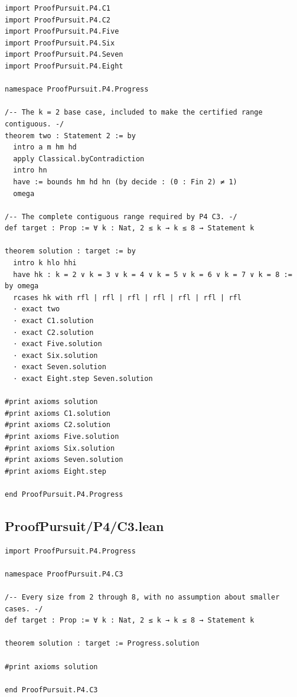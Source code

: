\documentclass[11pt,a4paper]{article}
\begin{document}
\begin{Verbatim}[breaklines,breakanywhere,fontsize=\footnotesize]
import ProofPursuit.P4.C1
import ProofPursuit.P4.C2
import ProofPursuit.P4.Five
import ProofPursuit.P4.Six
import ProofPursuit.P4.Seven
import ProofPursuit.P4.Eight

namespace ProofPursuit.P4.Progress

/-- The k = 2 base case, included to make the certified range contiguous. -/
theorem two : Statement 2 := by
  intro a m hm hd
  apply Classical.byContradiction
  intro hn
  have := bounds hm hd hn (by decide : (0 : Fin 2) ≠ 1)
  omega

/-- The complete contiguous range required by P4 C3. -/
def target : Prop := ∀ k : Nat, 2 ≤ k → k ≤ 8 → Statement k

theorem solution : target := by
  intro k hlo hhi
  have hk : k = 2 ∨ k = 3 ∨ k = 4 ∨ k = 5 ∨ k = 6 ∨ k = 7 ∨ k = 8 := by omega
  rcases hk with rfl | rfl | rfl | rfl | rfl | rfl | rfl
  · exact two
  · exact C1.solution
  · exact C2.solution
  · exact Five.solution
  · exact Six.solution
  · exact Seven.solution
  · exact Eight.step Seven.solution

#print axioms solution
#print axioms C1.solution
#print axioms C2.solution
#print axioms Five.solution
#print axioms Six.solution
#print axioms Seven.solution
#print axioms Eight.step

end ProofPursuit.P4.Progress
\end{Verbatim}

\subsection{ProofPursuit/P4/C3.lean}\label{proofpursuitp4c3.lean}

\begin{Verbatim}[breaklines,breakanywhere,fontsize=\footnotesize]
import ProofPursuit.P4.Progress

namespace ProofPursuit.P4.C3

/-- Every size from 2 through 8, with no assumption about smaller cases. -/
def target : Prop := ∀ k : Nat, 2 ≤ k → k ≤ 8 → Statement k

theorem solution : target := Progress.solution

#print axioms solution

end ProofPursuit.P4.C3
\end{Verbatim}
\end{document}
